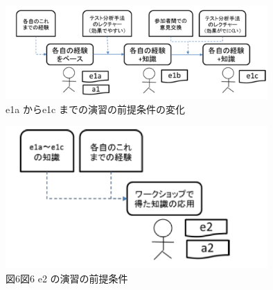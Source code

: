 \documentclass[a4paper,12pt]{jreport}
\begin{document}
   \begin{figure}[h]
  \begin{center}
  \includegraphics[width=10cm]{./image/D-3-Fig8.png}
  \caption{e1a からe1c までの演習の前提条件の変化}
  \label{fig:D-3-Fig8}
  \end{center}
   \end{figure}

   \begin{figure}[h]
  \begin{center}
  \includegraphics[width=10cm]{./image/D-3-Fig9.png}
  \caption{図6図6 e2 の演習の前提条件}
  \label{fig:D-3-Fig9}
  \end{center}
   \end{figure}
\end{document}
